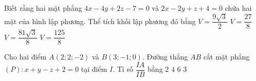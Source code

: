 \begin{ex}
	Biết rằng hai mặt phẳng $4x-4y+2z-7=0$ và $2x-2y+z+4=0$ chứa hai mặt của hình lập phương. Thể tích khối lập phương đó bằng
	\choice
	{$V=\dfrac{9 \sqrt{3}}{2}$}
	{$V=\dfrac{27}{8}$}
	{$V=\dfrac{81 \sqrt{3}}{8}$}
	{\True $V=\dfrac{125}{8}$}
\end{ex}
\begin{ex}
	Cho hai điểm $A(2;2;-2)$ và $B(3;-1;0)$. Đường thẳng $AB$ cắt mặt phẳng $(P)\colon x+y-z+2=0$ tại điểm $I$. Tỉ số $\dfrac{IA}{IB}$ bằng
	\choice
	{\True $2$}
	{$4$}
	{$6$}
	{$3$}
\end{ex}


